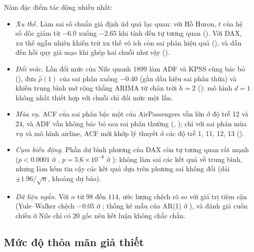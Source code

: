 Năm đặc điểm tác động nhiều nhất:
\begin{itemize}[leftmargin=*,itemsep=2pt]
\item \emph{Xu thế.} Làm sai số chuẩn giả định iid quá lạc quan: với Hồ Huron, $t$ của hệ số dốc giảm từ $-6.0$ xuống $-2.65$ khi tính đến tự tương quan (). Với DAX, xu thế ngẫu nhiên khiến trừ xu thế vô ích còn sai phân hiệu quả (), và dẫn đến hồi quy giả mạo khi ghép hai chuỗi như vậy ().
\item \emph{Đổi mức.} Lần đổi mức của Nile quanh 1899 làm ADF và KPSS cùng bác bỏ (), đưa $\hat\rho(1)$ của sai phân xuống $-0.40$ (gần dấu hiệu sai phân thừa) và khiến trung bình mở rộng thắng ARIMA từ chân trời $h=2$ (): mô hình $d=1$ không nhất thiết hợp với chuỗi chỉ đổi mức một lần.
\item \emph{Mùa vụ.} ACF của sai phân bậc một của AirPassengers vẫn lớn ở độ trễ 12 và 24, và ADF vẫn không bác bỏ sau sai phân thường (, ); chỉ với sai phân mùa vụ và mô hình airline, ACF mới khớp lý thuyết ở các độ trễ 1, 11, 12, 13 ().
\item \emph{Cụm biến động.} Phần dư bình phương của DAX còn tự tương quan rất mạnh ($p<0.0001$ ở , $p=5.6\times10^{-8}$ ở ): không làm sai các kết quả về trung bình, nhưng làm kém tin cậy các kết quả dựa trên phương sai không đổi (dải $\pm1.96/\sqrt n$, khoảng dự báo).
\item \emph{Dữ liệu ngắn.} Với $n$ từ $98$ đến $114$, ước lượng chệch rõ so với giá trị tiệm cận (Yule--Walker chệch $-0.05$ ở ; thống kê mẫu của AR(1) ở ), và đánh giá cuốn chiếu ở Nile chỉ có $20$ gốc nên kết luận không chắc chắn.
\end{itemize}

\subsection{Mức độ thỏa mãn giả thiết}

